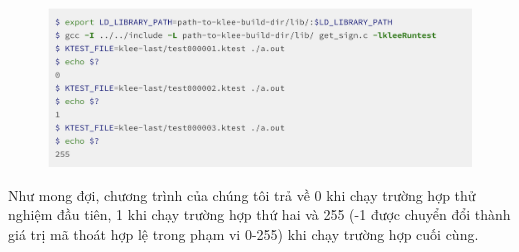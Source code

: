 \documentclass[12pt,a4paper]{article}
\begin{document}
\begin{figure}[ht]
\begin{center}
\includegraphics[scale=.3]{hinhanh/replayingtestcase.png}
\end{center}
\end{figure}

Như mong đợi, chương trình của chúng tôi trả về 0 khi chạy trường hợp thử nghiệm đầu tiên, 1 khi chạy trường hợp thứ hai và 255 (-1 được chuyển đổi thành giá trị mã thoát hợp lệ trong phạm vi 0-255) khi chạy trường hợp cuối cùng.
\end{document}
